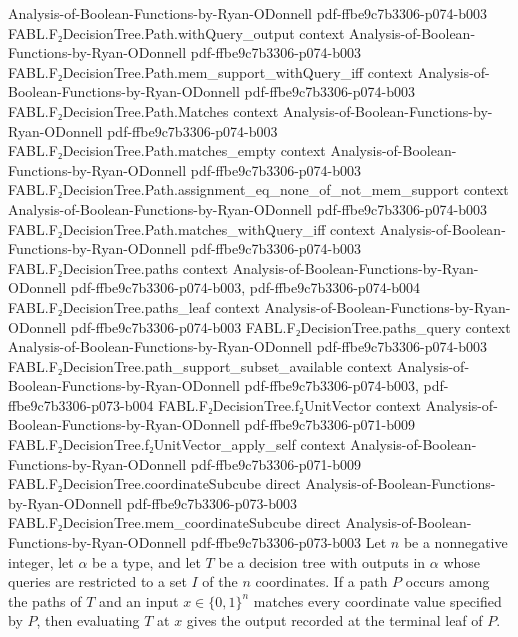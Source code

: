 \begin{theorem}
  {Analysis-of-Boolean-Functions-by-Ryan-ODonnell}
  {pdf-ffbe9c7b3306-p074-b003}
\proofstep
  {FABL.F₂DecisionTree.Path.withQuery_output}
  {context}
  {Analysis-of-Boolean-Functions-by-Ryan-ODonnell}
  {pdf-ffbe9c7b3306-p074-b003}
\proofstep
  {FABL.F₂DecisionTree.Path.mem_support_withQuery_iff}
  {context}
  {Analysis-of-Boolean-Functions-by-Ryan-ODonnell}
  {pdf-ffbe9c7b3306-p074-b003}
\proofstep
  {FABL.F₂DecisionTree.Path.Matches}
  {context}
  {Analysis-of-Boolean-Functions-by-Ryan-ODonnell}
  {pdf-ffbe9c7b3306-p074-b003}
\proofstep
  {FABL.F₂DecisionTree.Path.matches_empty}
  {context}
  {Analysis-of-Boolean-Functions-by-Ryan-ODonnell}
  {pdf-ffbe9c7b3306-p074-b003}
\proofstep
  {FABL.F₂DecisionTree.Path.assignment_eq_none_of_not_mem_support}
  {context}
  {Analysis-of-Boolean-Functions-by-Ryan-ODonnell}
  {pdf-ffbe9c7b3306-p074-b003}
\proofstep
  {FABL.F₂DecisionTree.Path.matches_withQuery_iff}
  {context}
  {Analysis-of-Boolean-Functions-by-Ryan-ODonnell}
  {pdf-ffbe9c7b3306-p074-b003}
\proofstep
  {FABL.F₂DecisionTree.paths}
  {context}
  {Analysis-of-Boolean-Functions-by-Ryan-ODonnell}
  {pdf-ffbe9c7b3306-p074-b003,
    pdf-ffbe9c7b3306-p074-b004}
\proofstep
  {FABL.F₂DecisionTree.paths_leaf}
  {context}
  {Analysis-of-Boolean-Functions-by-Ryan-ODonnell}
  {pdf-ffbe9c7b3306-p074-b003}
\proofstep
  {FABL.F₂DecisionTree.paths_query}
  {context}
  {Analysis-of-Boolean-Functions-by-Ryan-ODonnell}
  {pdf-ffbe9c7b3306-p074-b003}
\proofstep
  {FABL.F₂DecisionTree.path_support_subset_available}
  {context}
  {Analysis-of-Boolean-Functions-by-Ryan-ODonnell}
  {pdf-ffbe9c7b3306-p074-b003,
    pdf-ffbe9c7b3306-p073-b004}
\proofstep
  {FABL.F₂DecisionTree.f₂UnitVector}
  {context}
  {Analysis-of-Boolean-Functions-by-Ryan-ODonnell}
  {pdf-ffbe9c7b3306-p071-b009}
\proofstep
  {FABL.F₂DecisionTree.f₂UnitVector_apply_self}
  {context}
  {Analysis-of-Boolean-Functions-by-Ryan-ODonnell}
  {pdf-ffbe9c7b3306-p071-b009}
\proofstep
  {FABL.F₂DecisionTree.coordinateSubcube}
  {direct}
  {Analysis-of-Boolean-Functions-by-Ryan-ODonnell}
  {pdf-ffbe9c7b3306-p073-b003}
\proofstep
  {FABL.F₂DecisionTree.mem_coordinateSubcube}
  {direct}
  {Analysis-of-Boolean-Functions-by-Ryan-ODonnell}
  {pdf-ffbe9c7b3306-p073-b003}
Let $n$ be a nonnegative integer, let $\alpha$ be a type, and let $T$ be a decision tree
with outputs in $\alpha$ whose queries are restricted to a set $I$ of the $n$
coordinates. If a path $P$ occurs among the paths of $T$ and an input $x\in\{0,1\}^n$
matches every coordinate value specified by $P$, then evaluating $T$ at $x$ gives the
output recorded at the terminal leaf of $P$.
\end{theorem}

